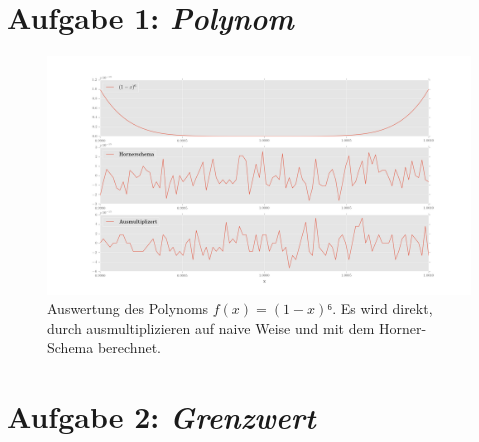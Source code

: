  
\section*{Aufgabe 1: \emph{Polynom}}

\begin{figure}
\centering
\includegraphics[width=\textwidth]{plot1.png}
\caption{Auswertung des Polynoms $f(x)=(1-x)⁶$. Es wird direkt, durch ausmultiplizieren auf naive Weise und mit dem Horner-Schema berechnet.}
\end{figure}

\section*{Aufgabe 2: \emph{Grenzwert}}

